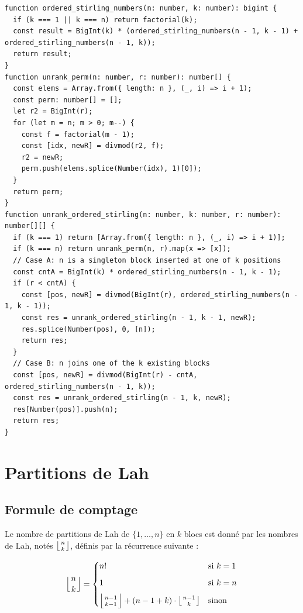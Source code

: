 \documentclass[12pt, a4paper]{report}
\begin{document}
\begin{verbatim}
function ordered_stirling_numbers(n: number, k: number): bigint {
  if (k === 1 || k === n) return factorial(k);
  const result = BigInt(k) * (ordered_stirling_numbers(n - 1, k - 1) + ordered_stirling_numbers(n - 1, k));
  return result;
}
function unrank_perm(n: number, r: number): number[] {
  const elems = Array.from({ length: n }, (_, i) => i + 1);
  const perm: number[] = [];
  let r2 = BigInt(r);
  for (let m = n; m > 0; m--) {
    const f = factorial(m - 1);
    const [idx, newR] = divmod(r2, f);
    r2 = newR;
    perm.push(elems.splice(Number(idx), 1)[0]);
  }
  return perm;
}
function unrank_ordered_stirling(n: number, k: number, r: number): number[][] {
  if (k === 1) return [Array.from({ length: n }, (_, i) => i + 1)];
  if (k === n) return unrank_perm(n, r).map(x => [x]);
  // Case A: n is a singleton block inserted at one of k positions
  const cntA = BigInt(k) * ordered_stirling_numbers(n - 1, k - 1);
  if (r < cntA) {
    const [pos, newR] = divmod(BigInt(r), ordered_stirling_numbers(n - 1, k - 1));
    const res = unrank_ordered_stirling(n - 1, k - 1, newR);
    res.splice(Number(pos), 0, [n]);
    return res;
  }
  // Case B: n joins one of the k existing blocks
  const [pos, newR] = divmod(BigInt(r) - cntA, ordered_stirling_numbers(n - 1, k));
  const res = unrank_ordered_stirling(n - 1, k, newR);
  res[Number(pos)].push(n);
  return res;
}
\end{verbatim}

\section{Partitions de Lah}

\subsection{Formule de comptage}

Le nombre de partitions de Lah de $\{1, \ldots, n\}$ en $k$ blocs est donn\'e par
les nombres de Lah, not\'es $\left\lfloor n \atop k \right\rfloor$, d\'efinis par
la r\'ecurrence suivante :

\[
  \left\lfloor n \atop k \right\rfloor =
  \begin{cases}
    n! & \text{si } k = 1 \\[6pt]
    1  & \text{si } k = n \\[6pt]
    \left\lfloor n-1 \atop k-1 \right\rfloor + (n - 1 + k) \cdot
    \left\lfloor n-1 \atop k \right\rfloor & \text{sinon}
  \end{cases}
\]
\end{document}
